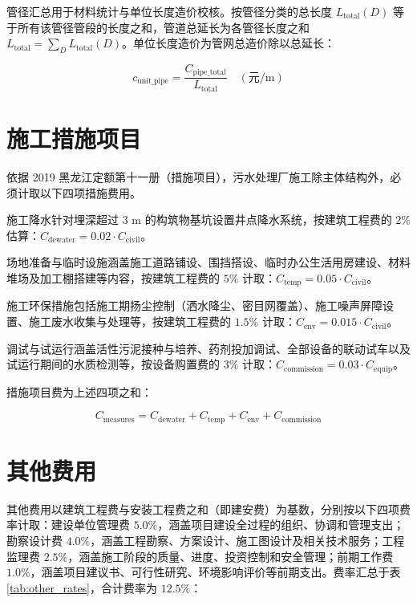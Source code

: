 \documentclass[12pt,a4paper]{ctexart}
\begin{document}
管径汇总用于材料统计与单位长度造价校核。按管径分类的总长度 $L_{\text{total}}(D)$ 等于所有该管径管段的长度之和，管道总延长为各管径长度之和 $L_{\text{total}} = \sum_D L_{\text{total}}(D)$。单位长度造价为管网总造价除以总延长：

\begin{equation}
c_{\text{unit\_pipe}} = \frac{C_{\text{pipe\_total}}}{L_{\text{total}}} \quad (\text{元/m})
\end{equation}

\section{施工措施项目}

依据 2019 黑龙江定额第十一册（措施项目），污水处理厂施工除主体结构外，必须计取以下四项措施费用。

施工降水针对埋深超过 3 m 的构筑物基坑设置井点降水系统，按建筑工程费的 $2\%$ 估算：$C_{\text{dewater}} = 0.02 \cdot C_{\text{civil}}$。

场地准备与临时设施涵盖施工道路铺设、围挡搭设、临时办公生活用房建设、材料堆场及加工棚搭建等内容，按建筑工程费的 $5\%$ 计取：$C_{\text{temp}} = 0.05 \cdot C_{\text{civil}}$。

施工环保措施包括施工期扬尘控制（洒水降尘、密目网覆盖）、施工噪声屏障设置、施工废水收集与处理等，按建筑工程费的 $1.5\%$ 计取：$C_{\text{env}} = 0.015 \cdot C_{\text{civil}}$。

调试与试运行涵盖活性污泥接种与培养、药剂投加调试、全部设备的联动试车以及试运行期间的水质检测等，按设备购置费的 $3\%$ 计取：$C_{\text{commission}} = 0.03 \cdot C_{\text{equip}}$。

措施项目费为上述四项之和：

\begin{equation}
C_{\text{measures}} = C_{\text{dewater}} + C_{\text{temp}} + C_{\text{env}} + C_{\text{commission}}
\end{equation}

\section{其他费用}

其他费用以建筑工程费与安装工程费之和（即建安费）为基数，分别按以下四项费率计取：建设单位管理费 $5.0\%$，涵盖项目建设全过程的组织、协调和管理支出；勘察设计费 $4.0\%$，涵盖工程勘察、方案设计、施工图设计及相关技术服务；工程监理费 $2.5\%$，涵盖施工阶段的质量、进度、投资控制和安全管理；前期工作费 $1.0\%$，涵盖项目建议书、可行性研究、环境影响评价等前期支出。费率汇总于表 \ref{tab:other_rates}，合计费率为 $12.5\%$：
\end{document}
